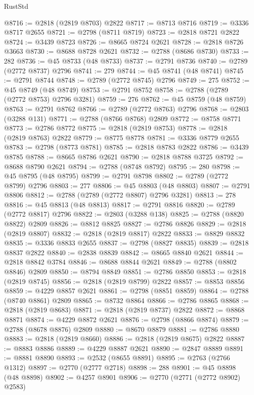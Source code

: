 \begin{lexlean}{RustStd}
\begin{coremodule}
@8716 := @2818 (@2819 @8703) @2822
@8717 := @8713 @8716
@8719 := @3336 @8717 @2655
@8721 := @2798 (@8711 @8719)
@8723 := @2818 @8721 @2822
@8724 := @3439 @8723
@8726 := @8665 @8724 @2621
@8728 := @2818 @8726 @3663
@8730 := @8688 @8728 @2621
@8732 := @2788 (@8686 @8730)
@8733 := 282
@8736 := @45 @8733 (@48 @8733)
@8737 := @2791 @8736
@8740 := @2789 (@2772 @8737) @2796
@8741 := 279
@8744 := @45 @8741 (@48 @8741)
@8745 := @2791 @8744
@8748 := @2789 (@2772 @8745) @2796
@8749 := 275
@8752 := @45 @8749 (@48 @8749)
@8753 := @2791 @8752
@8758 := @2788 (@2789 (@2772 @8753) @2796 @3281)
@8759 := 276
@8762 := @45 @8759 (@48 @8759)
@8763 := @2791 @8762
@8766 := @2789 (@2772 @8763) @2796
@8768 := @2803 (@3288 @131)
@8771 := @2788 (@8766 @8768) @2809
@8772 := @8758 @8771
@8773 := @2786 @8772
@8775 := @2818 (@2819 @8753)
@8778 := @2818 (@2819 @8763) @2822
@8779 := @8775 @8778
@8781 := @3336 @8779 @2655
@8783 := @2798 (@8773 @8781)
@8785 := @2818 @8783 @2822
@8786 := @3439 @8785
@8788 := @8665 @8786 @2621
@8790 := @2818 @8788 @3725
@8792 := @8688 @8790 @2621
@8794 := @2788 (@8748 @8792)
@8795 := 280
@8798 := @45 @8795 (@48 @8795)
@8799 := @2791 @8798
@8802 := @2789 (@2772 @8799) @2796
@8803 := 277
@8806 := @45 @8803 (@48 @8803)
@8807 := @2791 @8806
@8812 := @2788 (@2789 (@2772 @8807) @2796 @3281)
@8813 := 278
@8816 := @45 @8813 (@48 @8813)
@8817 := @2791 @8816
@8820 := @2789 (@2772 @8817) @2796
@8822 := @2803 (@3288 @138)
@8825 := @2788 (@8820 @8822) @2809
@8826 := @8812 @8825
@8827 := @2786 @8826
@8829 := @2818 (@2819 @8807)
@8832 := @2818 (@2819 @8817) @2822
@8833 := @8829 @8832
@8835 := @3336 @8833 @2655
@8837 := @2798 (@8827 @8835)
@8839 := @2818 @8837 @2822
@8840 := @2838 @8839
@8842 := @8665 @8840 @2621
@8844 := @2818 @8842 @3784
@8846 := @8688 @8844 @2621
@8849 := @2788 (@8802 @8846) @2809
@8850 := @8794 @8849
@8851 := @2786 @8850
@8853 := @2818 (@2819 @8745)
@8856 := @2818 (@2819 @8799) @2822
@8857 := @8853 @8856
@8859 := @4229 @8857 @2621
@8861 := @2798 (@8851 @8859)
@8864 := @2788 (@8740 @8861) @2809
@8865 := @8732 @8864
@8866 := @2786 @8865
@8868 := @2818 (@2819 @8683)
@8871 := @2818 (@2819 @8737) @2822
@8872 := @8868 @8871
@8874 := @4229 @8872 @2621
@8876 := @2798 (@8866 @8874)
@8879 := @2788 (@8678 @8876) @2809
@8880 := @8670 @8879
@8881 := @2786 @8880
@8883 := @2818 (@2819 @8660)
@8886 := @2818 (@2819 @8675) @2822
@8887 := @8883 @8886
@8889 := @4229 @8887 @2621
@8890 := @2847 @8889
@8891 := @8881 @8890
@8893 := @2532 (@8655 @8891)
@8895 := @2763 (@2766 @1312)
@8897 := @2770 (@2777 @2718)
@8898 := 288
@8901 := @45 @8898 (@48 @8898)
@8902 := @4257 @8901
@8906 := @2770 (@2771 (@2772 @8902) @2583)

\end{coremodule}
\end{lexlean}
